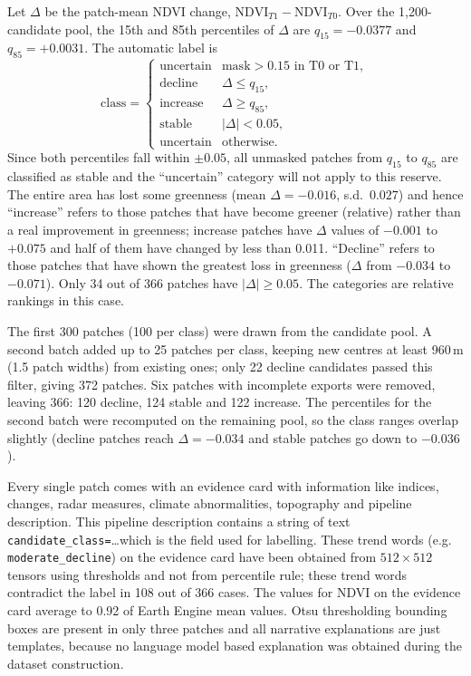 Let $\Delta$ be the patch-mean NDVI change,
$\mathrm{NDVI}_{T1} - \mathrm{NDVI}_{T0}$. Over the 1,200-candidate
pool, the 15th and 85th percentiles of $\Delta$ are $q_{15} = -0.0377$
and $q_{85} = +0.0031$. The automatic label is
\begin{equation}
\mathrm{class} =
\begin{cases}
\text{uncertain} & \text{mask} > 0.15 \text{ in T0 or T1},\\
\text{decline} & \Delta \le q_{15},\\
\text{increase} & \Delta \ge q_{85},\\
\text{stable} & |\Delta| < 0.05,\\
\text{uncertain} & \text{otherwise}.
\end{cases}
\end{equation}
Since both percentiles fall within $\pm 0.05$, all unmasked patches from
$q_{15}$ to $q_{85}$ are classified as stable and the ``uncertain''
category will not apply to this reserve. The entire area has lost some
greenness (mean $\Delta = -0.016$, s.d.\ $0.027$) and hence ``increase''
refers to those patches that have become greener (relative) rather than
a real improvement in greenness; increase patches have $\Delta$ values of
$-0.001$ to $+0.075$ and half of them have changed by less than 0.011.
``Decline'' refers to those patches that have shown the greatest loss in
greenness ($\Delta$ from $-0.034$ to $-0.071$). Only 34 out of 366 patches
have $|\Delta| \ge 0.05$. The categories are relative rankings in this case.

The first 300 patches (100 per class) were drawn from the candidate
pool. A second batch added up to 25 patches per class, keeping new
centres at least 960\,m (1.5 patch widths) from existing ones; only 22
decline candidates passed this filter, giving 372 patches. Six patches
with incomplete exports were removed, leaving 366: 120 decline, 124
stable and 122 increase. The percentiles for the second batch were
recomputed on the remaining pool, so the class ranges overlap slightly
(decline patches reach $\Delta = -0.034$ and stable patches go down to
$-0.036$).

Every single patch comes with an evidence card with information like
indices, changes, radar measures, climate abnormalities, topography and
pipeline description. This pipeline description contains a string of
text \texttt{candidate\_class=}\ldots which is the field used for
labelling. These trend words (e.g.
\texttt{moderate\_decline}) on the evidence card have been obtained
from $512 \times 512$ tensors using thresholds and not from percentile
rule; these trend words contradict the label in 108 out of 366 cases.
The values for NDVI on the evidence card average to 0.92 of Earth
Engine mean values. Otsu thresholding bounding boxes are present in
only three patches and all narrative explanations are just templates,
because no language model based explanation was obtained during the
dataset construction.

